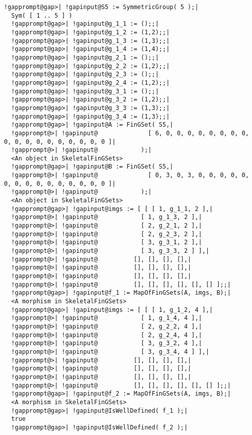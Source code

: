 \documentclass[a4paper,11pt]{report}
\begin{document}
{{{\begin{Verbatim}[commandchars=!@|,fontsize=\small,frame=single,label=Example]
  !gapprompt@gap>| !gapinput@S5 := SymmetricGroup( 5 );|
  Sym( [ 1 .. 5 ] )
  !gapprompt@gap>| !gapinput@g_1_1 := ();;|
  !gapprompt@gap>| !gapinput@g_1_2 := (1,2);;|
  !gapprompt@gap>| !gapinput@g_1_3 := (1,3);;|
  !gapprompt@gap>| !gapinput@g_1_4 := (1,4);;|
  !gapprompt@gap>| !gapinput@g_2_1 := ();;|
  !gapprompt@gap>| !gapinput@g_2_2 := (1,2);;|
  !gapprompt@gap>| !gapinput@g_2_3 := ();;|
  !gapprompt@gap>| !gapinput@g_2_4 := (1,2);;|
  !gapprompt@gap>| !gapinput@g_3_1 := ();;|
  !gapprompt@gap>| !gapinput@g_3_2 := (1,2);;|
  !gapprompt@gap>| !gapinput@g_3_3 := (1,3);;|
  !gapprompt@gap>| !gapinput@g_3_4 := (1,3);;|
  !gapprompt@gap>| !gapinput@A := FinGSet( S5,|
  !gapprompt@>| !gapinput@              [ 6, 0, 0, 0, 0, 0, 0, 0, 0, 0, 0, 0, 0, 0, 0, 0, 0, 0, 0 ]|
  !gapprompt@>| !gapinput@            );|
  <An object in SkeletalFinGSets>
  !gapprompt@gap>| !gapinput@B := FinGSet( S5,|
  !gapprompt@>| !gapinput@              [ 0, 3, 0, 3, 0, 0, 0, 0, 0, 0, 0, 0, 0, 0, 0, 0, 0, 0, 0 ]|
  !gapprompt@>| !gapinput@            );|
  <An object in SkeletalFinGSets>
  !gapprompt@gap>| !gapinput@imgs := [ [ [ 1, g_1_1, 2 ],|
  !gapprompt@>| !gapinput@            [ 1, g_1_3, 2 ],|
  !gapprompt@>| !gapinput@            [ 2, g_2_1, 2 ],|
  !gapprompt@>| !gapinput@            [ 2, g_2_3, 2 ],|
  !gapprompt@>| !gapinput@            [ 3, g_3_1, 2 ],|
  !gapprompt@>| !gapinput@            [ 3, g_3_3, 2 ] ],|
  !gapprompt@>| !gapinput@          [], [], [], [],|
  !gapprompt@>| !gapinput@          [], [], [], [],|
  !gapprompt@>| !gapinput@          [], [], [], [],|
  !gapprompt@>| !gapinput@          [], [], [], [], [], [] ];;|
  !gapprompt@gap>| !gapinput@f_1 := MapOfFinGSets(A, imgs, B);|
  <A morphism in SkeletalFinGSets>
  !gapprompt@gap>| !gapinput@imgs := [ [ [ 1, g_1_2, 4 ],|
  !gapprompt@>| !gapinput@            [ 1, g_1_4, 4 ],|
  !gapprompt@>| !gapinput@            [ 2, g_2_2, 4 ],|
  !gapprompt@>| !gapinput@            [ 2, g_2_4, 4 ],|
  !gapprompt@>| !gapinput@            [ 3, g_3_2, 4 ],|
  !gapprompt@>| !gapinput@            [ 3, g_3_4, 4 ] ],|
  !gapprompt@>| !gapinput@          [], [], [], [],|
  !gapprompt@>| !gapinput@          [], [], [], [],|
  !gapprompt@>| !gapinput@          [], [], [], [],|
  !gapprompt@>| !gapinput@          [], [], [], [], [], [] ];;|
  !gapprompt@gap>| !gapinput@f_2 := MapOfFinGSets(A, imgs, B);|
  <A morphism in SkeletalFinGSets>
  !gapprompt@gap>| !gapinput@IsWellDefined( f_1 );|
  true
  !gapprompt@gap>| !gapinput@IsWellDefined( f_2 );|

\end{Verbatim}}}}
\end{document}
